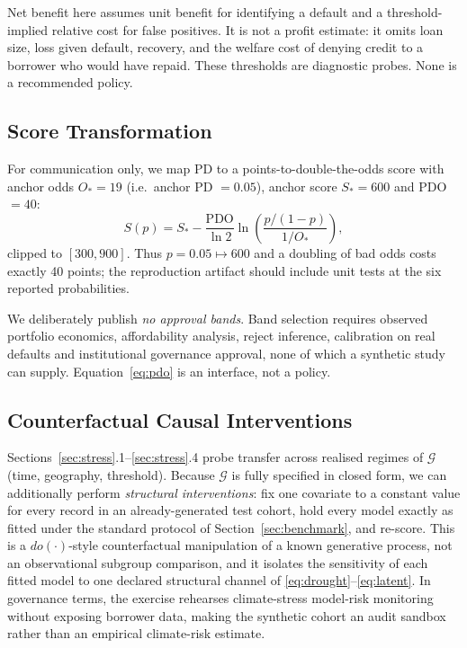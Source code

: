 \documentclass[journal]{IEEEtran}
\newcommand{\dgp}{\ensuremath{\mathcal{G}}}
\begin{document}
Net benefit here assumes unit benefit for identifying a default and a threshold-implied relative cost for false positives. It is not a profit estimate: it omits loan size, loss given default, recovery, and the welfare cost of denying credit to a borrower who would have repaid. These thresholds are diagnostic probes. None is a recommended policy.

\subsection{Score Transformation}
For communication only, we map PD to a points-to-double-the-odds score with anchor odds $O_\ast=19$ (i.e.\ anchor PD $=0.05$), anchor score $S_\ast=600$ and PDO $=40$:
\begin{equation}
S(p)=S_\ast-\frac{\text{PDO}}{\ln 2}\ln\!\left(\frac{p/(1-p)}{1/O_\ast}\right),
\label{eq:pdo}
\end{equation}
clipped to $[300,900]$. Thus $p=0.05\mapsto600$ and a doubling of bad odds costs exactly 40 points; the reproduction artifact should include unit tests at the six reported probabilities.

We deliberately publish \emph{no approval bands}. Band selection requires observed portfolio economics, affordability analysis, reject inference, calibration on real defaults and institutional governance approval, none of which a synthetic study can supply. Equation~\eqref{eq:pdo} is an interface, not a policy.

\subsection{Counterfactual Causal Interventions}
\label{sec:causal}
Sections~\ref{sec:stress}.1--\ref{sec:stress}.4 probe transfer across realised regimes of $\dgp$ (time, geography, threshold). Because $\dgp$ is fully specified in closed form, we can additionally perform \emph{structural interventions}: fix one covariate to a constant value for every record in an already-generated test cohort, hold every model exactly as fitted under the standard protocol of Section~\ref{sec:benchmark}, and re-score. This is a $do(\cdot)$-style counterfactual manipulation of a known generative process, not an observational subgroup comparison, and it isolates the sensitivity of each fitted model to one declared structural channel of \eqref{eq:drought}--\eqref{eq:latent}. In governance terms, the exercise rehearses climate-stress model-risk monitoring without exposing borrower data, making the synthetic cohort an audit sandbox rather than an empirical climate-risk estimate.
\end{document}
